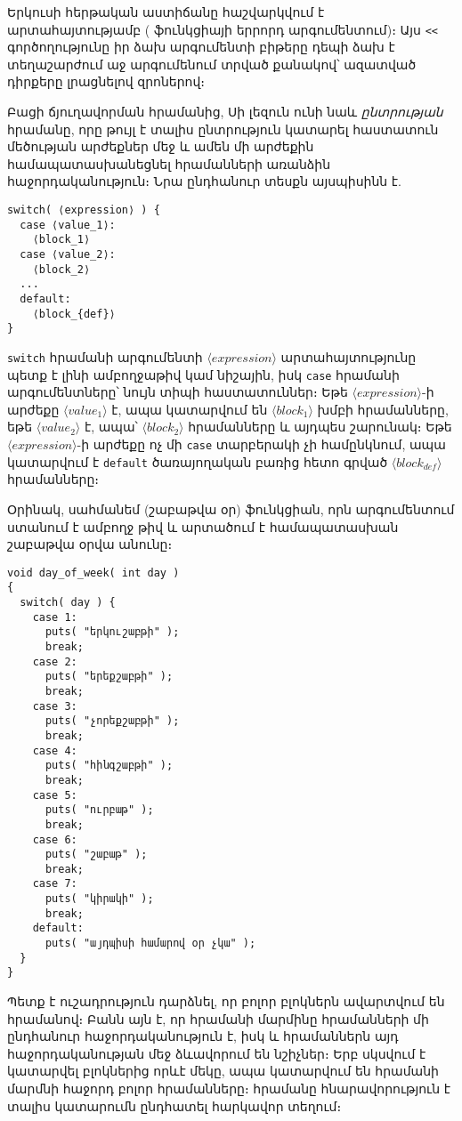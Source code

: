 Երկուսի հերթական  աստիճանը հաշվարկվում է 
արտահայտությամբ ( ֆունկցիայի երրորդ արգումենտում)։ Այս
\verb|<<| գործողությունը իր ձախ արգումենտի բիթերը դեպի ձախ է տեղաշարժում
աջ արգումենում տրված քանակով՝ ազատված դիրքերը լրացնելով զրոներով։

\medskip
Բացի  ճյուղավորման հրամանից, Սի լեզուն ունի նաև
 \emph{ընտրության} հրամանը, որը թույլ է տալիս ընտրություն
կատարել հաստատուն մեծության արժեքներ մեջ և ամեն մի արժեքին համապատասխանեցնել
հրամանների առանձին հաջորդականություն։ Նրա ընդհանուր տեսքն այսպիսինն է.

\begin{Verbatim}
switch( ⟨expression⟩ ) {
  case ⟨value_1⟩:
    ⟨block_1⟩
  case ⟨value_2⟩:
    ⟨block_2⟩
  ...
  default:
    ⟨block_{def}⟩
}
\end{Verbatim}

\texttt{switch} հրամանի արգումենտի \(\langle expression\rangle\)
արտահայտությունը պետք է լինի ամբողջաթիվ կամ նիշային, իսկ \texttt{case}
հրամանի արգումենտները՝ նույն տիպի հաստատուններ։ Եթե
\(\langle expression\rangle\)-ի արժեքը \(\langle value_1\rangle\) է,
ապա կատարվում են \(\langle block_1\rangle\) խմբի հրամանները, եթե
\(\langle value_2\rangle\) է, ապա՝ \(\langle block_2\rangle\) հրամանները
և այդպես շարունակ։ Եթե \(\langle expression\rangle\)-ի արժեքը ոչ մի
\texttt{case} տարբերակի չի համընկնում, ապա կատարվում է \texttt{default}
ծառայողական բառից հետո գրված \(\langle block_{def}\rangle\) հրամանները։

Օրինակ, սահմանեմ  (շաբաթվա օր) ֆունկցիան, որն
արգումենտում ստանում է ամբողջ թիվ և արտածում է համապատասխան շաբաթվա
օրվա անունը։

\begin{Verbatim}
void day_of_week( int day )
{
  switch( day ) {
    case 1:
      puts( "երկուշաբթի" );
      break;
    case 2:
      puts( "երեքշաբթի" );
      break;
    case 3:
      puts( "չորեքշաբթի" );
      break;
    case 4:
      puts( "հինգշաբթի" );
      break;
    case 5:
      puts( "ուրբաթ" );
      break;
    case 6:
      puts( "շաբաթ" );
      break;
    case 7:
      puts( "կիրակի" );
      break;
    default:
      puts( "այդպիսի համարով օր չկա" );
  }
}
\end{Verbatim}

Պետք է ուշադրություն դարձնել, որ բոլոր  բլոկներն ավարտվում
են  հրամանով։ Բանն այն է, որ  հրամանի մարմինը
հրամանների մի ընդհանուր հաջորդականություն է, իսկ  և
 հրամաններն այդ հաջորդականության մեջ ձևավորում են նշիչներ։
Երբ սկսվում է կատարվել բլոկներից որևէ մեկը, ապա կատարվում են 
հրամանի մարմնի հաջորդ բոլոր հրամանները։  հրամանը հնարավորություն
է տալիս կատարումն ընդհատել հարկավոր տեղում։

